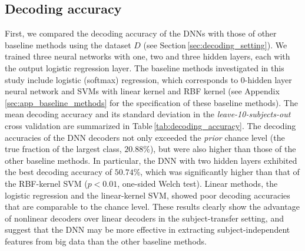 \subsection{Decoding accuracy}
\label{sec:decoding_accuracy}
First, we compared the decoding accuracy of the DNNs with those of other baseline methods using the dataset $D$ (see Section\,\ref{sec:decoding_setting}).
We trained three neural networks with one, two and three hidden layers, each with the output logistic regression layer.
%
The baseline methods investigated in this study
include logistic (softmax) regression, which corresponds to 0-hidden layer neural network and SVMs with linear kernel and RBF kernel (see Appendix\,\ref{sec:app_baseline_methods} for the specification of these baseline methods).
The mean decoding accuracy and its standard deviation in the \textit{leave-10-subjects-out} cross validation are summarized in Table\,\ref{tab:decoding_accuracy}.
%
The decoding accuracies of the DNN decoders not only exceeded the \textit{prior} chance level (the true fraction of the largest class, $20.88$\%), but were also higher than those of the other baseline methods.
%
In particular, the DNN with two hidden layers exhibited the best decoding accuracy of $50.74$\%, which was  significantly higher than that of the RBF-kernel SVM ($p < 0.01 $, one-sided Welch test).
%
Linear methods, the logistic regression and the linear-kernel SVM,
showed poor decoding accuracies that are comparable to the chance level.
%
These results clearly show the advantage of nonlinear decoders over linear decoders in the subject-transfer setting, and suggest that the DNN may be more effective in extracting subject-independent features from big data than the other baseline methods.
%
